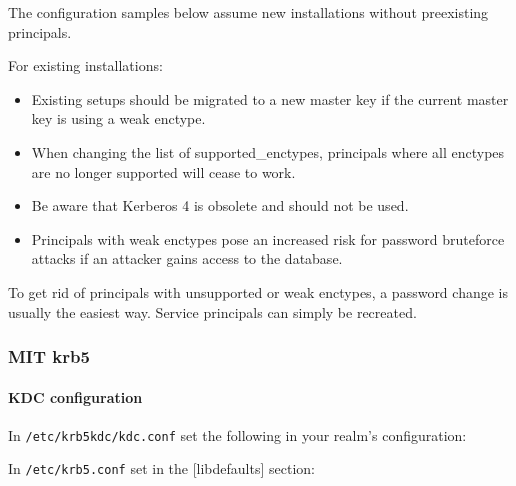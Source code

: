 The configuration samples below assume new installations without preexisting principals.

For existing installations:
\begin{itemize}
	\item Existing setups should be migrated to a new master key if the current master key is using a weak enctype.
	\item When changing the list of supported\_enctypes, principals where all enctypes are no longer supported will cease to work.
	\item Be aware that Kerberos 4 is obsolete and should not be used.
	\item Principals with weak enctypes pose an increased risk for password bruteforce attacks if an attacker gains access to the database.
\end{itemize}

To get rid of principals with unsupported or weak enctypes, a password change is usually the easiest way. Service principals can simply be recreated. 

\subsubsection{MIT krb5}
\gdef\currentsubsectionname{krb5}
\paragraph{KDC configuration}
In \verb#/etc/krb5kdc/kdc.conf# set the following in your realm's
configuration:

In \verb#/etc/krb5.conf# set in the [libdefaults] section:




